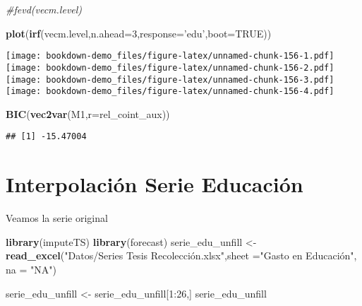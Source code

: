 \documentclass[]{book}
\newenvironment{Shaded}{\begin{snugshade}}{\end{snugshade}}
\newcommand{\KeywordTok}[1]{\textcolor[rgb]{0.13,0.29,0.53}{\textbf{#1}}}
\newcommand{\DataTypeTok}[1]{\textcolor[rgb]{0.13,0.29,0.53}{#1}}
\newcommand{\DecValTok}[1]{\textcolor[rgb]{0.00,0.00,0.81}{#1}}
\newcommand{\StringTok}[1]{\textcolor[rgb]{0.31,0.60,0.02}{#1}}
\newcommand{\CommentTok}[1]{\textcolor[rgb]{0.56,0.35,0.01}{\textit{#1}}}
\newcommand{\OtherTok}[1]{\textcolor[rgb]{0.56,0.35,0.01}{#1}}
\newcommand{\NormalTok}[1]{#1}
\theoremstyle{definition}
\theoremstyle{definition}
\theoremstyle{definition}
\theoremstyle{remark}
\begin{document}
\begin{Shaded}
\begin{Highlighting}[]
\CommentTok{#fevd(vecm.level)}
\end{Highlighting}
\end{Shaded}

\begin{Shaded}
\begin{Highlighting}[]
\KeywordTok{plot}\NormalTok{(}\KeywordTok{irf}\NormalTok{(vecm.level,}\DataTypeTok{n.ahead=}\DecValTok{3}\NormalTok{,}\DataTypeTok{response=}\StringTok{'edu'}\NormalTok{,}\DataTypeTok{boot=}\OtherTok{TRUE}\NormalTok{))}
\end{Highlighting}
\end{Shaded}

\texttt{[image: bookdown-demo\_files/figure-latex/unnamed-chunk-156-1.pdf]}
\texttt{[image: bookdown-demo\_files/figure-latex/unnamed-chunk-156-2.pdf]}
\texttt{[image: bookdown-demo\_files/figure-latex/unnamed-chunk-156-3.pdf]}
\texttt{[image: bookdown-demo\_files/figure-latex/unnamed-chunk-156-4.pdf]}

\begin{Shaded}
\begin{Highlighting}[]
\KeywordTok{BIC}\NormalTok{(}\KeywordTok{vec2var}\NormalTok{(M1,}\DataTypeTok{r=}\NormalTok{rel_coint_aux))}
\end{Highlighting}
\end{Shaded}

\begin{verbatim}
## [1] -15.47004
\end{verbatim}

\chapter{Interpolación Serie
Educación}\label{interpolacion-serie-educacion}

Veamos la serie original

\begin{Shaded}
\begin{Highlighting}[]
\KeywordTok{library}\NormalTok{(imputeTS)}
\KeywordTok{library}\NormalTok{(forecast)}
\NormalTok{serie_edu_unfill <-}\StringTok{ }\KeywordTok{read_excel}\NormalTok{(}\StringTok{"Datos/Series Tesis Recolección.xlsx"}\NormalTok{,}\DataTypeTok{sheet =}\StringTok{"Gasto en Educación", na = "}\NormalTok{NA}\StringTok{")}

\StringTok{serie_edu_unfill <- serie_edu_unfill[1:26,]}
\StringTok{serie_edu_unfill}
\end{Highlighting}
\end{Shaded}
\end{document}
